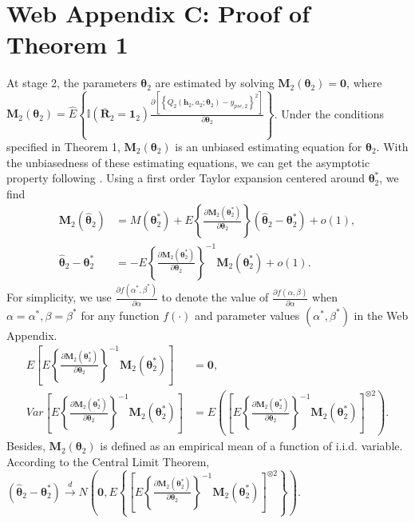 \documentclass[12pt]{article}
\begin{document}
\section{Web Appendix C: Proof of Theorem 1}

At stage 2, the parameters $\bm{\theta}_2$ are estimated by solving $\bm{M}_2(\bm{\theta}_2) = \bm{0}$, where $\bm{M}_2(\bm{\theta}_2) =\widehat{E}\left\{\mathbb{I} (\overline{\bm{R}}_{2}=\bm{1}_2) \frac{\partial \left[ \left\{  
  Q_2(\bm{h}_2,a_2;\bm{\theta}_2) - y_{pse,2}\right\} ^2\right]}{\partial \bm{\theta}_2} \right\}$. Under the conditions specified in Theorem 1, $\bm{M}_2(\bm{\theta}_2)$ is an unbiased estimating equation for $\bm{\theta}_2$. With the unbiasedness of these estimating equations, we can get the asymptotic property following \citet[Thm. 6.1]{Newey_McFadden_1994}. Using a first order Taylor expansion centered around $\bm{\theta}_2^*$, we find
\begin{align*}
    \bm{M}_2(\widehat{\bm{\theta}}_2) &= M(\bm{\theta}_2^*) + E\left\{\frac{\partial \bm{M}_2(\bm{\theta}_2^*)}{\partial \bm{\theta}_2}\right\}(\widehat{\bm{\theta}}_2 - \bm{\theta}_2^*) + o(1),\\
    \widehat{\bm{\theta}}_2 - \bm{\theta}_2^* &= -E\left\{\frac{\partial \bm{M}_2(\bm{\theta}_2^*)}{\partial \bm{\theta}_2}\right\}^{-1}\bm{M}_2(\bm{\theta}_2^*)+ o(1).
\end{align*}
For simplicity, we use $\frac{\partial f(\alpha^*, \beta^*)}{\partial \alpha}$ to denote the value of $\frac{\partial f(\alpha,\beta)}{\partial \alpha}$ when $\alpha = \alpha^*, \beta = \beta^*$ for any function $f(\cdot)$ and parameter values $(\alpha^*,\beta^*)$ in the Web Appendix.
\begin{align*}
    E\left[E\left\{\frac{\partial \bm{M}_2(\bm{\theta}_2^*)}{\partial \bm{\theta}_2}\right\}^{-1}\bm{M}_2(\bm{\theta}_2^*)\right] &= \bm{0},\\
    Var\left[E\left\{\frac{\partial \bm{M}_2(\bm{\theta}_2^*)}{\partial \bm{\theta}_2}\right\}^{-1}\bm{M}_2(\bm{\theta}_2^*)\right] &=E\left(\left[E\left\{\frac{\partial \bm{M}_2(\bm{\theta}_2^*)}{\partial \bm{\theta}_2}\right\}^{-1}\bm{M}_2(\bm{\theta}_2^*) \right]^{\otimes 2}\right).
\end{align*}
Besides, $\bm{M}_2(\bm{\theta}_2)$ is defined as an empirical mean of a function of i.i.d. variable. According to the Central Limit Theorem, $(\widehat{\bm{\theta}}_2 - \bm{\theta}_2^*) \stackrel{d}{\longrightarrow} N\left(\bm{0}, E\left\{\left[E\left\{\frac{\partial \bm{M}_2(\bm{\theta}_2^*)}{\partial \bm{\theta}_2}\right\}^{-1}\bm{M}_2(\bm{\theta}_2^*) \right]^{\otimes 2}\right\} \right)$.
\end{document}
